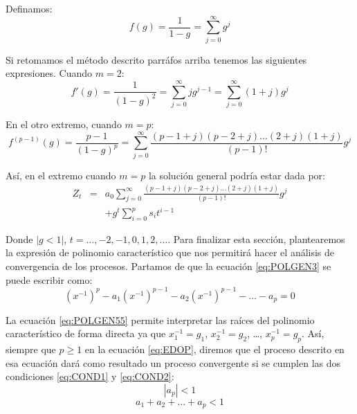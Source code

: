 \documentclass[
]{book}
\begin{document}
Definamos:
\begin{equation}
    f(g) = \frac{1}{1 - g} = \sum_{j = 0}^{\infty} g^j
    \label{eq:EDOPGEN4}
\end{equation}

Si retomamos el método descrito parráfos arriba tenemos las siguientes expresiones. Cuando \(m = 2\):
\begin{equation}
    f'(g) = \frac{1}{(1 - g)^2} = \sum_{j = 0}^{\infty} j g^{j-1} = \sum_{j = 0}^{\infty} (1 + j) g^j \nonumber
\end{equation}

En el otro extremo, cuando \(m = p\):
\begin{equation}
    f^{(p-1)}(g) = \frac{p-1}{(1 - g)^p} = \sum_{j = 0}^{\infty} \frac{(p-1+j)(p-2+j) \ldots (2+j)(1+j)}{(p-1)!} g^j
    \label{eq:EDOPGEN5}
\end{equation}

Así, en el extremo cuando \(m = p\) la solución general podría estar dada por:
\begin{eqnarray}
    Z_t & = & a_0 \sum_{j = 0}^{\infty} \frac{(p-1+j)(p-2+j) \ldots (2+j)(1+j)}{(p-1)!} g^j \nonumber \\
    & & + g^t \sum_{i = 0}^p s_i t^{i-1}
    \label{eq:EDOPGEN6}
\end{eqnarray}

Donde \(|{g} < 1|\), \(t = \ldots, -2, -1, 0, 1, 2, \ldots\). Para finalizar esta sección, plantearemos la expresión de polinomio característico que nos permitirá hacer el análisis de convergencia de los procesos. Partamos de que la ecuación \eqref{eq:POLGEN3} se puede escribir como:
\begin{equation}
    (x^{-1})^p - a_1 (x^{-1})^{p-1} - a_2 (x^{-1})^{p-1} - \ldots - a_p = 0
    \label{eq:POLGEN55}
\end{equation}

La ecuación \eqref{eq:POLGEN55} permite interpretar las raíces del polinomio característico de forma directa ya que \(x^{-1}_1 = g_1\), \(x^{-1}_2 = g_2\), \ldots, \(x^{-1}_p = g_p\). Así, siempre que \(p \geq 1\) en la ecuación \eqref{eq:EDOP}, diremos que el proceso descrito en esa ecuación dará como resultado un proceso convergente si se cumplen las dos condiciones \eqref{eq:COND1} y \eqref{eq:COND2}:
\begin{equation}
    |a_p| < 1  
    \label{eq:COND1}
\end{equation}
\begin{equation}
    a_1 + a_2 + \ldots + a_p < 1
    \label{eq:COND2}
\end{equation}
\end{document}
